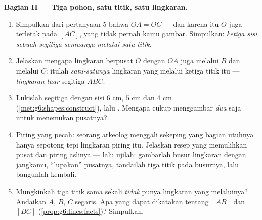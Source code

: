 \begin{problem}
\medskip
\noindent\textbf{Bagian II --- Tiga pohon, satu titik, satu
lingkaran.}
\begin{enumerate}[resume]
  \item Simpulkan dari pertanyaan 5 bahwa $OA = OC$ --- dan karena
        itu $O$ juga terletak pada  $[AC]$, yang tidak
        pernah kamu gambar. Simpulkan: \emph{ketiga  sisi
        sebuah segitiga semuanya melalui satu titik.}
  \item Jelaskan mengapa lingkaran berpusat $O$ dengan  $OA$
        juga melalui $B$ dan melalui $C$: itulah \emph{satu-satunya}
        lingkaran yang melalui ketiga titik itu --- \emph{lingkaran
        luar} segitiga $ABC$.
  \item Lukislah segitiga dengan sisi $6$ cm, $5$ cm dan $4$ cm
        (\cref{met:g6:shapes:construct}), lalu .
        Mengapa cukup menggambar \emph{dua}  saja untuk
        menemukan pusatnya?
  \item Piring yang pecah: seorang arkeolog menggali sekeping 
        yang bagian utuhnya hanya sepotong tepi lingkaran piring itu.
        Jelaskan resep yang memulihkan pusat dan  piring
        aslinya --- lalu ujilah: gambarlah busur lingkaran dengan
        jangkamu, ``lupakan'' pusatnya, tandailah tiga titik pada
        busurnya, lalu bangunlah kembali.
  \item Mungkinkah tiga titik sama sekali \emph{tidak} punya
        lingkaran yang melaluinya? Andaikan $A$, $B$, $C$ segaris.
        Apa yang dapat dikatakan tentang  $[AB]$ dan  $[BC]$ (\cref{prop:g6:lines:facts})? Simpulkan.
\end{enumerate}


\end{problem}
